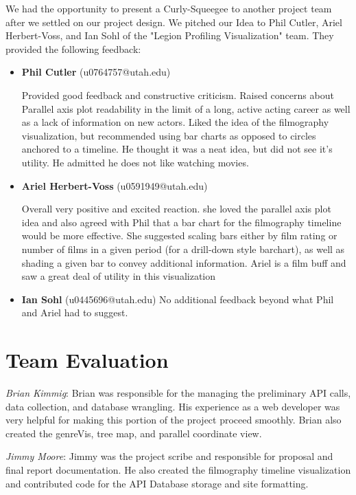 \documentclass[12pt]{article}
\begin{document}
We had the opportunity to present a Curly-Squeegee to another project team after we settled on our project design.   We pitched our Idea to Phil Cutler, Ariel Herbert-Voss, and Ian Sohl of the "Legion Profiling Visualization" team. They provided the following feedback:

\begin{itemize}
	\item \textbf{Phil Cutler} (u0764757@utah.edu)
	
	Provided good feedback and constructive criticism. Raised concerns about Parallel axis plot readability in the limit of a long, active acting career as well as a lack of information on new actors. Liked the idea of the filmography visualization, but recommended using bar charts as opposed to circles anchored to a timeline. He thought it was a neat idea, but did not see it's utility. He admitted he does not like watching movies.
	
	
	\item \textbf{Ariel Herbert-Voss} (u0591949@utah.edu)
	
	Overall very positive and excited reaction. she loved the parallel axis plot idea and also agreed with Phil that a bar chart for the filmography timeline would be more effective. She suggested scaling bars either by film rating or number of films in a given period (for a drill-down style barchart), as well as shading a given bar to convey additional information. Ariel is a film buff and saw a great deal of utility in this visualization
	
	\item \textbf{Ian Sohl} (u0445696@utah.edu)
		No additional feedback beyond what Phil and Ariel had to suggest.
\end{itemize}

\newpage

\section{Team Evaluation}

\textit{Brian Kimmig}: Brian was responsible for the managing the preliminary API calls, data collection, and database wrangling. His experience as a web developer was very helpful for making this portion of the project proceed smoothly. Brian also created  the genreVis, tree map, and parallel coordinate view.

\vspace{1em}

\noindent \textit{Jimmy Moore}: Jimmy was the project scribe and responsible for proposal and final report documentation.  He also created the filmography timeline visualization and contributed code for the API Database storage and site formatting. 
\end{document}
